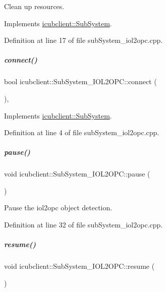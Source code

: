 Clean up resources. 



Implements \hyperlink{group__icubclient__subsystems_af327c56ad0d33aada77f825d96fb47f2}{icubclient\+::\+Sub\+System}.



Definition at line 17 of file sub\+System\+\_\+iol2opc.\+cpp.

\mbox{\label{group__icubclient__subsystems_a1407547931468f9d704e10e3436ed467}} 
\subparagraph{\texorpdfstring{connect()}{connect()}}
{\footnotesize\ttfamily bool icubclient\+::\+Sub\+System\+\_\+\+I\+O\+L2\+O\+P\+C\+::connect (\begin{DoxyParamCaption}{ }\end{DoxyParamCaption})\hspace{0.3cm}{\ttfamily [protected]}, {\ttfamily [virtual]}}



Implements \hyperlink{group__icubclient__subsystems_a5fc84b6e51ec56f91323280b7da52dc8}{icubclient\+::\+Sub\+System}.



Definition at line 4 of file sub\+System\+\_\+iol2opc.\+cpp.

\mbox{\label{group__icubclient__subsystems_a09c98f6a86748aa507fdb0d28ee1309a}} 
\subparagraph{\texorpdfstring{pause()}{pause()}}
{\footnotesize\ttfamily void icubclient\+::\+Sub\+System\+\_\+\+I\+O\+L2\+O\+P\+C\+::pause (\begin{DoxyParamCaption}{ }\end{DoxyParamCaption})}



Pause the iol2opc object detection. 



Definition at line 32 of file sub\+System\+\_\+iol2opc.\+cpp.

\mbox{\label{group__icubclient__subsystems_a6633b7fcf67e9d7153f8060aab3d9a98}} 
\subparagraph{\texorpdfstring{resume()}{resume()}}
{\footnotesize\ttfamily void icubclient\+::\+Sub\+System\+\_\+\+I\+O\+L2\+O\+P\+C\+::resume (\begin{DoxyParamCaption}{ }\end{DoxyParamCaption})}




